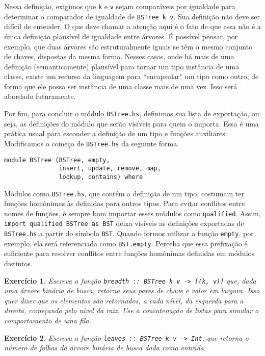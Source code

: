 \documentclass[a4paper]{article}
\newtheorem{exercicio}{Exercício}
\begin{document}
Nessa definição, exigimos que \texttt{k} e \texttt{v} sejam comparáveis por igualdade para determinar o comparador de igualdade de \texttt{BSTree k v}.
Sua definição não deve ser difícil de entender.
O que deve chamar a atenção aqui é o fato de que essa não é a única definição plausível de igualdade entre árvores.
É possível pensar, por exemplo, que duas árvores são estruturalmente iguais se têm o mesmo conjunto de chaves, dispostas da mesma forma.
Nesses casos, onde há mais de uma definição (semanticamente) plausível para tornar um tipo instância de uma classe, existe um recurso da linguagem para ``encapsular" um tipo como outro, de forma que ele possa ser instância de uma classe mais de uma vez.
Isso será abordado futuramente.

Por fim, para concluir o módulo \texttt{BSTree.hs}, definimos sua lista de exportação, ou seja, as definições do módulo que serão visíveis para quem o importa.
Essa é uma prática usual para esconder a definição de um tipo e funções auxiliares.
Modificamos o começo de \texttt{BSTree.hs} da seguinte forma.

\begin{verbatim}
module BSTree (BSTree, empty,
               insert, update, remove, map,
               lookup, contains) where
\end{verbatim}

Módulos como \texttt{BSTree.hs}, que contém a definição de um tipo, costumam ter funções homônimas às definidas para outros tipos.
Para evitar conflitos entre nomes de funções, é sempre bom importar esses módulos como \texttt{qualified}.
Assim, \mbox{\texttt{import qualified BSTree as BST}} deixa vísiveis as definições exportadas de \texttt{BSTree.hs} a partir do símbolo \texttt{BST}.
Quando formos utilizar a função \texttt{empty}, por exemplo, ela será referenciada como \texttt{BST.empty}.
Perceba que essa prefixação é suficiente para resolver conflitos entre funções homônimas definidas em módulos distintos.

\begin{exercicio}
	Escreva a função \emph{\texttt{breadth :: BSTree k v -> [(k, v)]}} que, dada uma árvore binária de busca, retorna seus pares de chave e valor em largura.
	Isso quer dizer que os elementos são retornados, a cada nível, da esquerda para a direita, começando pelo nível da raiz.
	Use a concatenação de listas para simular o comportamento de uma fila.
\end{exercicio}

\begin{exercicio}
	Escreva a função \emph{\texttt{leaves :: BSTree k v -> Int}}, que retorna o número de folhas da árvore binária de busca dada como entrada.
\end{exercicio}
\end{document}

